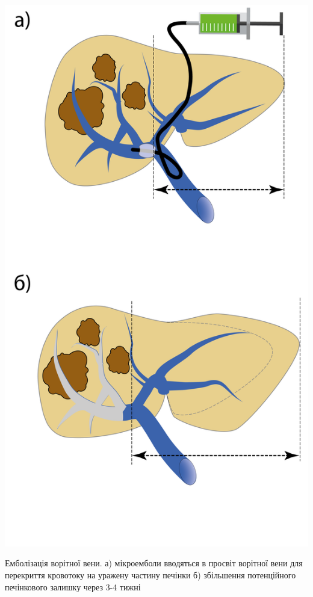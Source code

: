 \begin{itemize}
\begin{itemize}
        \begin{marginfigure}%
            \includegraphics[width=\linewidth]{Figures/PVE_Vertical.png}
            \caption{Емболізація ворітної вени. а) мікроемболи вводяться в просвіт ворітної вени для перекриття кровотоку на уражену частину печінки б) збільшення потенційного печінкового залишку через 3-4 тижні }
            \label{fig:goalbladder}
        \end{marginfigure}
        

\end{itemize}
\end{itemize}
